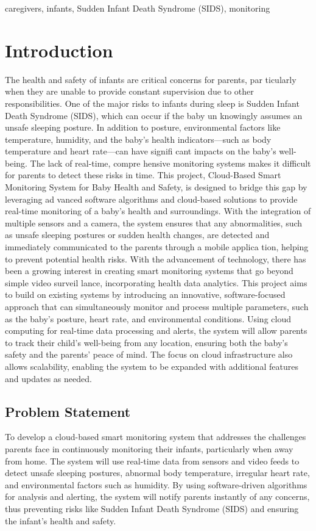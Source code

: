 \documentclass[conference]{IEEEtran}
\begin{document}
\begin{IEEEkeywords}
caregivers, infants, Sudden Infant Death Syndrome (SIDS), monitoring
\end{IEEEkeywords}

\section{Introduction}
The health and safety of infants are critical concerns for parents, par
ticularly when they are unable to provide constant supervision due to
 other responsibilities. One of the major risks to infants during sleep is
 Sudden Infant Death Syndrome (SIDS), which can occur if the baby un
knowingly assumes an unsafe sleeping posture. In addition to posture,
 environmental factors like temperature, humidity, and the baby’s health
 indicators—such as body temperature and heart rate—can have signifi
cant impacts on the baby’s well-being. The lack of real-time, compre
hensive monitoring systems makes it difficult for parents to detect these
 risks in time. This project, Cloud-Based Smart Monitoring System for
 Baby Health and Safety, is designed to bridge this gap by leveraging ad
vanced software algorithms and cloud-based solutions to provide real-time
 monitoring of a baby’s health and surroundings. With the integration of
 multiple sensors and a camera, the system ensures that any abnormalities,
 such as unsafe sleeping postures or sudden health changes, are detected
 and immediately communicated to the parents through a mobile applica
tion, helping to prevent potential health risks.
 With the advancement of technology, there has been a growing interest
 in creating smart monitoring systems that go beyond simple video surveil
lance, incorporating health data analytics. This project aims to build on
 existing systems by introducing an innovative, software-focused approach
 that can simultaneously monitor and process multiple parameters, such
 as the baby’s posture, heart rate, and environmental conditions. Using  cloud computing for real-time data processing and alerts, the system will
 allow parents to track their child’s well-being from any location, ensuring
 both the baby’s safety and the parents’ peace of mind. The focus on cloud
 infrastructure also allows scalability, enabling the system to be expanded
 with additional features and updates as needed.

 \subsection{Problem Statement}
To develop a cloud-based smart monitoring system that addresses the challenges parents face in continuously monitoring their infants, particularly when away from home. The system will use real-time data from sensors and video feeds to detect unsafe sleeping postures, abnormal body temperature, irregular heart rate, and environmental factors such as humidity. By using software-driven algorithms for analysis and alerting, the system will notify parents instantly of any concerns, thus preventing risks like Sudden Infant Death Syndrome (SIDS) and ensuring the infant’s health and safety.
\end{document}
